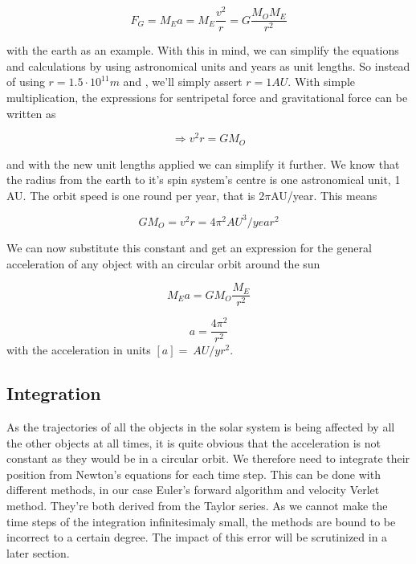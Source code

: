 \documentclass[10pt]{article}
\begin{document}
\begin{multicols}{2}
\begin{equation}
    F_G = M_Ea = M_E\frac{v^2}{r} = G\frac{M_OM_E}{r^2}
\end{equation}



with the earth as an example. With this in mind, we can simplify the
equations and calculations by using astronomical units and years as unit
lengths. So instead of using $r = 1.5\cdot10^{11}m$ and , we'll simply
assert $r = 1AU$. With simple multiplication, the expressions for
sentripetal force and gravitational force can be written as 

\begin{equation}
    \Rightarrow v^2r = GM_O
\end{equation}

and with the new unit lengths applied we can simplify it further. We know
that the radius from the earth to it's spin system's centre is one
astronomical unit, 1 AU. The orbit speed is one round per year, that is
2$\pi$AU/year. This means

\begin{equation}
    GM_O = v^2r = 4\pi^2AU^3/year^2
\end{equation}

We can now substitute this constant and get an expression for the general
acceleration of any object with an circular orbit around the sun

\begin{equation}
    M_Ea = GM_O\frac{M_E}{r^2}
\end{equation}

\begin{equation}
    a = \frac{4\pi^2}{r^2}
\end{equation}
with the acceleration in units $[a] = \SI{}{AU/yr^2}$.

\subsection{Integration}
As the trajectories of all the objects in the solar system is being
affected by all the other objects at all times, it is quite obvious that
the acceleration is not constant as they would be in a circular orbit. We
therefore need to integrate their position from Newton's equations for each
time step. This can be done with different methods, in our case Euler's
forward algorithm and velocity Verlet method. They're both derived from the
Taylor series. As we cannot make the time steps of the integration
infinitesimaly small, the methods are bound to be incorrect to a certain
degree. The impact of this error will be scrutinized in a later section.


\end{multicols}
\end{document}
